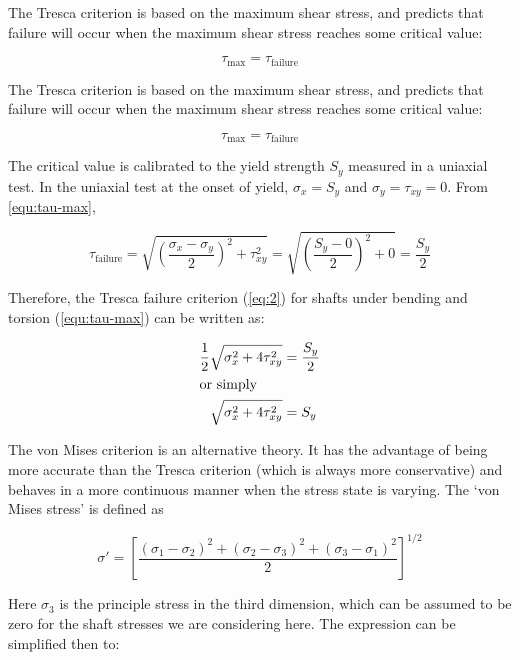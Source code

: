 The Tresca criterion is based on the maximum shear stress, and predicts that failure will occur when the maximum shear stress reaches some critical value:

\begin{equation}
  \tau_{\max} = \tau_{\text{failure}}
\end{equation}

The Tresca criterion is based on the maximum shear
stress, and predicts that failure will occur when the maximum shear stress
reaches some critical value:

\begin{equation}
\label{eq:2}
\tau_\mathrm{max} = \tau_\mathrm{failure}
\end{equation}

The critical value is calibrated to the yield strength $S_y$ measured in a
uniaxial test. In the uniaxial test at the onset of yield, $\sigma_x = S_y$ and
$\sigma_y = \tau_{xy} = 0$. From \cref{equ:tau-max},

\begin{equation}
\label{eq:4}
\tau_\mathrm{failure} = \sqrt{\left(\frac{\sigma_x-\sigma_y}{2}\right)^2+\tau_{xy}^2} = \sqrt{\left(\frac{S_y-0}{2}\right)^2+0} = \frac{S_y}{2}
\end{equation}

Therefore, the Tresca failure criterion (\cref{eq:2}) for shafts under bending
and torsion (\cref{equ:tau-max}) can be written as:

\begin{align}
\label{eq:5}
\frac{1}{2} \sqrt{\sigma_x^2+4\tau_{xy}^2} &= \frac{S_y}{2} \\
              \intertext{or simply}
  \label{eq:tresca-failure}
\sqrt{\sigma_x^2+4\tau_{xy}^2} &= S_y
\end{align}

The von Mises criterion is an alternative
theory. It has the advantage of being more accurate than the Tresca criterion
(which is always more conservative) and behaves in a more continuous manner when
the stress state is varying. The `von Mises stress' is defined as

\begin{equation}
\label{eq:7}
\sigma' = \left[ \frac{ 
    \left( \sigma_1 - \sigma_2 \right)^2 +
    \left( \sigma_2 - \sigma_3 \right)^2 +
    \left( \sigma_3 - \sigma_1 \right)^2
  }{2} \right]^{1/2}
\end{equation}

Here $\sigma_3$ is the principle stress in the third dimension, which can be
assumed to be zero for the shaft stresses we are considering here. The
expression can be simplified then to:

